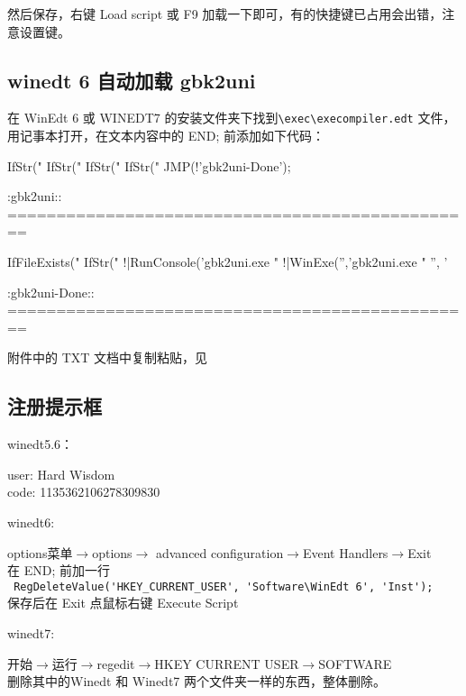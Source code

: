 然后保存，右键 Load script 或 F9 加载一下即可，有的快捷键已占用会出错，注意设置键。

\subsection{winedt 6 自动加载 gbk2uni}

在 WinEdt 6 或 WINEDT7 的安装文件夹下找到\verb|\exec\execompiler.edt| 文件，用记事本打开，在文本内容中的 END; 前添加如下代码：
\scriptsize

\begin{cmd}[label= 复制 winedt 代码]
IfStr("%
IfStr("%
IfStr("%
IfStr("%
JMP(!'gbk2uni-Done');

:gbk2uni:: ================================================

IfFileExists("%
IfStr("%
!|RunConsole('gbk2uni.exe "%
!|WinExe('','gbk2uni.exe "%
'', '%

:gbk2uni-Done:: ================================================
\end{cmd}


\normalsize
附件中的 TXT 文档中复制粘贴，见
\subsection{注册提示框}

winedt5.6：
\begin{shaded}
\noindent
user: Hard Wisdom\\
code: 1135362106278309830
\end{shaded}

winedt6:
\begin{shaded}
options菜单$\rightarrow$options$\rightarrow$ advanced configuration$\rightarrow$Event Handlers$\rightarrow$Exit\\
在 END; 前加一行\\
\wuhao\verb| RegDeleteValue('HKEY_CURRENT_USER', 'Software\WinEdt 6', 'Inst');|\\
\normalsize 保存后在 Exit 点鼠标右键 Execute Script
\end{shaded}

winedt7:
\begin{shaded}
开始$\rightarrow$运行$\rightarrow$regedit$\rightarrow$HKEY CURRENT USER$\rightarrow$SOFTWARE\\
删除其中的Winedt 和 Winedt7 两个文件夹一样的东西，整体删除。
\end{shaded}

